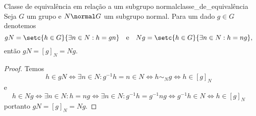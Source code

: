 \begin{lemma}{Classe de equivalência em relação a um subgrupo normal}{classe_de_equivalência}
    Seja \(G\) um grupo e \(N\normal G\) um subgrupo normal. Para um dado \(g \in G\) denotemos
    \begin{equation*}
        gN = \setc{h \in G}{\exists n \in N : h = gn}\quad\text{e}\quad
        Ng = \setc{h \in G}{\exists n \in N : h = ng},
    \end{equation*}
    então \(gN = [g]_N = Ng\).
\end{lemma}
\begin{proof}
    Temos
    \begin{equation*}
        h \in gN \iff \exists n \in N : g^{-1}h = n \in N \iff h \sim_N g \iff h \in [g]_N
    \end{equation*}
    e
    \begin{equation*}
        h \in Ng \iff \exists n \in N : h = n g \iff \exists n \in N : g^{-1} h = g^{-1} n g \iff g^{-1} h \in N \iff h \in [g]_N
    \end{equation*}
    portanto \(gN = [g]_N = Ng\).
\end{proof}


